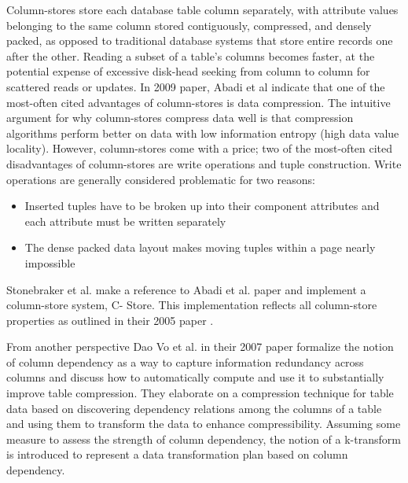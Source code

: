 \documentclass[twocolumn]{article}
\begin{document}
Column-stores store each database table column separately, with attribute values belonging to the
same column stored contiguously, compressed, and densely packed, as opposed to traditional database
systems that store entire records one after the other. Reading a subset of a table’s columns becomes
faster, at the potential expense of excessive disk-head seeking from column to column for scattered
reads or updates. In 2009 paper, Abadi et al \cite{ref:col-oriented} indicate that one of the most-often
cited advantages of column-stores is data compression. The intuitive argument for why column-stores compress data
well is that compression algorithms perform better on data with low information entropy (high data
value locality). However, column-stores come with a price; two of the most-often cited disadvantages
of column-stores are write operations and tuple construction. Write operations are generally
considered problematic for two reasons:

\begin{itemize}
\item Inserted tuples have to be broken up into their component attributes and each
attribute must be written separately
\item The dense packed data layout makes moving tuples within a page nearly impossible
\end{itemize}

Stonebraker et al. make a reference to Abadi et al. paper and implement a column-store system, C-
Store. This implementation reflects all column-store properties as outlined in their 2005 paper
\cite{ref:cstore}.

From another perspective Dao Vo et al. in their 2007 paper \cite{ref:table-dep} formalize the
notion of column dependency as a way to capture information redundancy across columns and discuss how to
automatically compute and use it to substantially improve table compression. They elaborate on
a compression technique for table data based on discovering dependency relations among the
columns of a table and using them to transform the data to enhance compressibility. Assuming
some measure to assess the strength of column dependency, the notion of a k-transform is
introduced to represent a data transformation plan based on column dependency.
\end{document}
